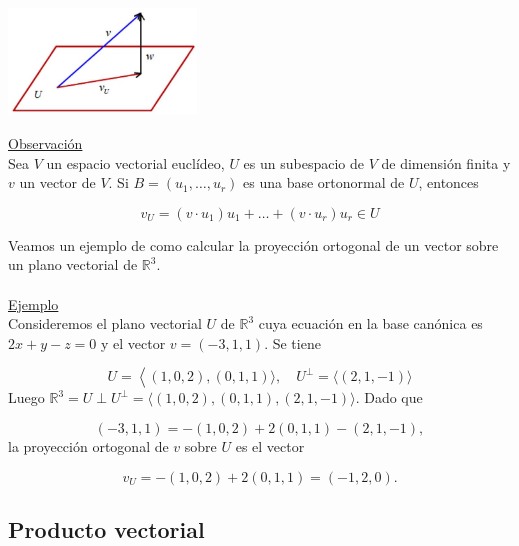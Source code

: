 \documentclass[12pt, a4paper, ones, notitlepage, openany,titlepage]{article}
\begin{document}
\begin{center}
	\includegraphics[max width=5cm]{2023_03_20_c2fe6c117849a1a0e8afg-048}
\end{center}
\underline{Observación}\\
Sea $V$ un espacio vectorial euclídeo, $U$ es un subespacio de $V$ de dimensión finita y $v$ un vector de $V$. Si $B=\left(u_{1}, \ldots, u_{r}\right)$ es una base ortonormal de $U$, entonces

$$
v_{U}=\left(v \cdot u_{1}\right) u_{1}+\ldots+\left(v \cdot u_{r}\right) u_{r} \in U
$$

Veamos un ejemplo de como calcular la proyección ortogonal de un vector sobre un plano vectorial de $\mathbb{R}^{3}$.\\\\
\underline{Ejemplo}\\
Consideremos el plano vectorial $U$ de $\mathbb{R}^{3}$ cuya ecuación en la base canónica es $2 x+y-z=0$ y el vector $v=(-3,1,1)$. Se tiene

$$
U=\left\langle(1,0,2),(0,1,1)\rangle, \quad U^{\perp}=\langle(2,1,-1)\rangle\right.
$$
Luego $\mathbb{R}^{3}=U \perp U^{\perp}=\langle(1,0,2),(0,1,1),(2,1,-1)\rangle$. Dado que

$$
(-3,1,1)=-(1,0,2)+2(0,1,1)-(2,1,-1),
$$
la proyección ortogonal de $v$ sobre $U$ es el vector

$$
v_{U}=-(1,0,2)+2(0,1,1)=(-1,2,0) .
$$

\subsection{Producto vectorial}
\end{document}
